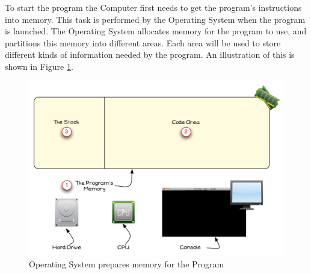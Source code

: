 To start the program the Computer first needs to get the program's instructions into memory. This task is performed by the Operating System when the program is launched. The Operating System allocates memory for the program to use, and partitions this memory into different areas. Each area will be used to store different kinds of information needed by the program. An illustration of this is shown in Figure \ref{fig:program-creation-visualise-helloworld-1}.

\begin{figure}[htbp]
   \centering
   \includegraphics[width=\textwidth]{./topics/program-creation/images/ProgramExecution01} 
   \caption[Program Memory Space]{Operating System prepares memory for the Program}
   \label{fig:program-creation-visualise-helloworld-1}
\end{figure}


